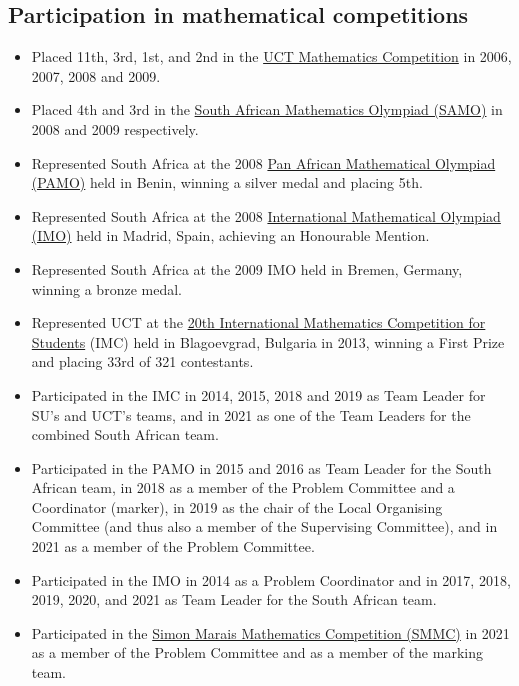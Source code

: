 \documentclass{article}
\begin{document}
\subsection{Participation in mathematical competitions}
\begin{itemize}
	\item Placed 11th, 3rd, 1st, and 2nd in the \href{http://www.mth.uct.ac.za/competition/}{UCT Mathematics Competition} in 2006, 2007, 2008 and 2009.
	\item Placed 4th and 3rd in the \href{http://www.samf.ac.za/sa-mathematics-olympiad}{South African Mathematics Olympiad (SAMO)} in 2008 and 2009 respectively.
	\item Represented South Africa at the 2008 \href{https://www.africamathunion.org/AMU-pamo-official.php}{Pan African Mathematical Olympiad (PAMO)} held in Benin, winning a silver medal and placing 5th.
	\item Represented South Africa at the 2008 \href{http://imo-official.org/}{International Mathematical Olympiad (IMO)} held in Madrid, Spain, achieving an Honourable Mention.
	\item Represented South Africa at the 2009 IMO held in Bremen, Germany, winning a bronze medal.
	\item Represented UCT at the \href{http://www.imc-math.org.uk/index.php?year=2013}{20th International Mathematics Competition for Students} (IMC) held in Blagoevgrad, Bulgaria in 2013, winning a First Prize and placing 33rd of 321 contestants.
	\item Participated in the IMC in 2014, 2015, 2018 and 2019 as Team Leader for SU's and UCT's teams, and in 2021 as one of the Team Leaders for the combined South African team.
	\item Participated in the PAMO in 2015 and 2016 as Team Leader for the South African team, in 2018 as a member of the Problem Committee and a Coordinator (marker), in 2019 as the chair of the Local Organising Committee (and thus also a member of the Supervising Committee), and in 2021 as a member of the Problem Committee.
	\item Participated in the IMO in 2014 as a Problem Coordinator and in 2017, 2018, 2019, 2020, and 2021 as Team Leader for the South African team.
	\item Participated in the \href{http://www.simonmarais.org/}{Simon Marais Mathematics Competition (SMMC)} in 2021 as a member of the Problem Committee and as a member of the marking team.
\end{itemize}
\end{document}
